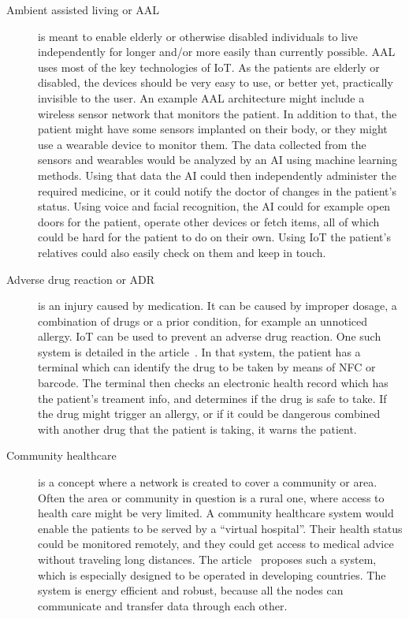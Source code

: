 \begin{description}
  \item[Ambient assisted living or AAL] is meant to enable elderly or otherwise
    disabled individuals to live independently for longer and/or more easily
    than currently possible. AAL uses most of the key technologies of IoT. As
    the patients are elderly or disabled, the devices should be very easy to
    use, or better yet, practically invisible to the user. An example AAL
    architecture might include a wireless sensor network that monitors the
    patient. In addition to that, the patient might have some sensors implanted
    on their body, or they might use a wearable device to monitor them. The
    data collected from the sensors and wearables would be analyzed by an AI
    using machine learning methods. Using that data the AI could then
    independently administer the required medicine, or it could notify the
    doctor of changes in the patient's status. Using voice and facial
    recognition, the AI could for example open doors for the patient, operate
    other devices or fetch items, all of which could be hard for the patient to
    do on their own. Using IoT the patient's relatives could also easily check
    on them and keep in touch.~\cite{Istepanian2011}

  \item[Adverse drug reaction or ADR] is an injury caused by medication. It can
    be caused by improper dosage, a combination of drugs or a prior condition,
    for example an unnoticed allergy. IoT can be used to prevent an adverse
    drug reaction. One such system is detailed in the article~\cite{Jara2010}.
    In that system, the patient has a terminal which can identify the drug to
    be taken by means of NFC or barcode. The terminal then checks an electronic
    health record which has the patient's treament info, and determines if the
    drug is safe to take. If the drug might trigger an allergy, or if it could
    be dangerous combined with another drug that the patient is taking, it
    warns the patient.

  \item[Community healthcare] is a concept where a network is created to cover
    a community or area. Often the area or community in question is a rural
    one, where access to health care might be very limited. A community
    healthcare system would enable the patients to be served by a ``virtual
    hospital''. Their health status could be monitored remotely, and they could
    get access to medical advice without traveling long distances. The
    article~\cite{Rohokale2011} proposes such a system, which is especially
    designed to be operated in developing countries. The system is energy
    efficient and robust, because all the nodes can communicate and transfer
    data through each other.

\end{description}

